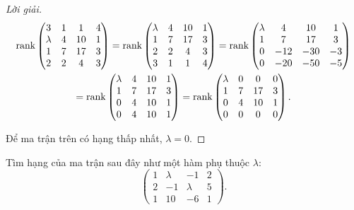 \documentclass[class=nhvh-linear-algebra,crop=false]{standalone}
\begin{document}
\begin{proof}[Lời giải]
	\begingroup{}
	\allowdisplaybreaks{}
	\begin{gather*}
		\text{rank}\begin{pmatrix}
			3       & 1 & 1  & 4 \\
			\lambda & 4 & 10 & 1 \\
			1       & 7 & 17 & 3 \\
			2       & 2 & 4  & 3
		\end{pmatrix}
		=\text{rank}\begin{pmatrix}
			\lambda & 4 & 10 & 1 \\
			1       & 7 & 17 & 3 \\
			2       & 2 & 4  & 3 \\
			3       & 1 & 1  & 4 \\
		\end{pmatrix}
		=\text{rank}\begin{pmatrix}
			\lambda & 4   & 10  & 1  \\
			1       & 7   & 17  & 3  \\
			0       & -12 & -30 & -3 \\
			0       & -20 & -50 & -5 \\
		\end{pmatrix} \\
		=\text{rank}\begin{pmatrix}
			\lambda & 4 & 10 & 1 \\
			1       & 7 & 17 & 3 \\
			0       & 4 & 10 & 1 \\
			0       & 4 & 10 & 1 \\
		\end{pmatrix}
		=\text{rank}\begin{pmatrix}
			\lambda & 0 & 0  & 0 \\
			1       & 7 & 17 & 3 \\
			0       & 4 & 10 & 1 \\
			0       & 0 & 0  & 0 \\
		\end{pmatrix}.
	\end{gather*}
	\endgroup{}
	\par Để ma trận trên có hạng thấp nhất, $\lambda = 0$.
\end{proof}

\begin{exercise}
	\par Tìm hạng của ma trận sau đây như một hàm phụ thuộc $\lambda$:
	\[
		\begin{pmatrix}
			1 & \lambda & -1      & 2 \\
			2 & -1      & \lambda & 5 \\
			1 & 10      & -6      & 1
		\end{pmatrix}.
	\]
\end{exercise}
\end{document}

